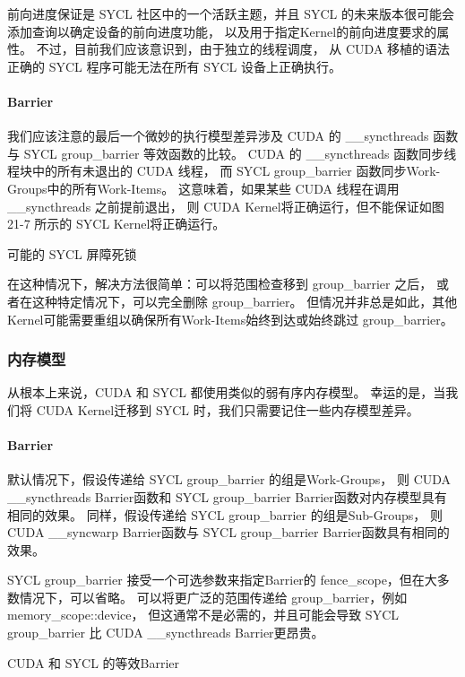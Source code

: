 前向进度保证是 SYCL 社区中的一个活跃主题，并且 SYCL 的未来版本很可能会添加查询以确定设备的前向进度功能，
以及用于指定Kernel的前向进度要求的属性。 不过，目前我们应该意识到，由于独立的线程调度，
从 CUDA 移植的语法正确的 SYCL 程序可能无法在所有 SYCL 设备上正确执行。

\paragraph{Barrier}

我们应该注意的最后一个微妙的执行模型差异涉及 CUDA 的 \_\_syncthreads 函数
与 SYCL group\_barrier 等效函数的比较。 
CUDA 的 \_\_syncthreads 函数同步线程块中的所有未退出的 CUDA 线程，
而 SYCL group\_barrier 函数同步Work-Groups中的所有Work-Items。 
这意味着，如果某些 CUDA 线程在调用 \_\_syncthreads 之前提前退出，
则 CUDA Kernel将正确运行，但不能保证如图 21-7 所示的 SYCL Kernel将正确运行。

{\color{red} 可能的 SYCL 屏障死锁}

在这种情况下，解决方法很简单：可以将范围检查移到 group\_barrier 之后，
或者在这种特定情况下，可以完全删除 group\_barrier。 
但情况并非总是如此，其他Kernel可能需要重组以确保所有Work-Items始终到达或始终跳过 group\_barrier。

\subsubsection{内存模型}
从根本上来说，CUDA 和 SYCL 都使用类似的弱有序内存模型。 
幸运的是，当我们将 CUDA Kernel迁移到 SYCL 时，我们只需要记住一些内存模型差异。

\paragraph{Barrier}

默认情况下，假设传递给 SYCL group\_barrier 的组是Work-Groups，
则 CUDA \_\_syncthreads Barrier函数和 SYCL group\_barrier Barrier函数对内存模型具有相同的效果。 
同样，假设传递给 SYCL group\_barrier 的组是Sub-Groups，
则 CUDA \_\_syncwarp Barrier函数与 SYCL group\_barrier Barrier函数具有相同的效果。

SYCL group\_barrier 接受一个可选参数来指定Barrier的 fence\_scope，但在大多数情况下，可以省略。 
可以将更广泛的范围传递给 group\_barrier，例如 memory\_scope::device，
但这通常不是必需的，并且可能会导致 SYCL group\_barrier 比 CUDA \_\_syncthreads Barrier更昂贵。

{\color{red} CUDA 和 SYCL 的等效Barrier}

